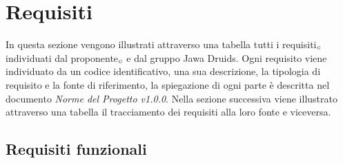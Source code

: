 \chapter{Requisiti}\label{Requisiti}
In questa sezione vengono illustrati attraverso una tabella tutti i requisiti$_{\scaleto{G}{3pt}}$ individuati dal proponente$_{\scaleto{G}{3pt}}$ e dal gruppo Jawa Druids. Ogni requisito viene individuato da un codice identificativo, una sua descrizione, la tipologia di requisito e la fonte di riferimento, la spiegazione di ogni parte è descritta nel documento \textit{Norme del Progetto v1.0.0}. Nella sezione successiva viene illustrato attraverso una tabella il tracciamento dei requisiti alla loro fonte e viceversa.
\section{Requisiti funzionali}\label{RequisitiFunzionali}

